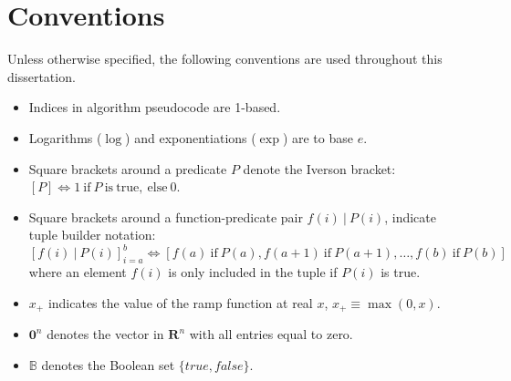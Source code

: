 \chapter*{Conventions}
Unless otherwise specified, the following conventions are used throughout this dissertation.

\begin{itemize}
  \item Indices in algorithm pseudocode are 1-based.
  \item Logarithms ($\log$) and exponentiations ($\exp$) are to base $e$.
  \item Square brackets around a predicate $P$ denote the Iverson bracket: $\left[P\right] \Leftrightarrow 1\ \mathrm{if}\ P \mathrm{~is~true,~else}\ 0$.
  \item Square brackets around a function-predicate pair $f(i)~|~P(i)$, indicate tuple builder notation: 
  \[
  \left[f(i)~|~P(i)\right]_{i=a}^b \Leftrightarrow \left[ f(a)~\mathrm{if}~P(a), f(a+1)~\mathrm{if}~P(a+1), \dots, f(b)~\mathrm{if}~P(b) \right]
  \]
  where an element $f(i)$ is only included in the tuple if $P(i)$ is true.
  \item $x_+$ indicates the value of the ramp function at real $x$, $x_+ \equiv \max(0, x)$.
  \item $\mathbf{0}^n$ denotes the vector in $\mathbf{R}^n$ with all entries equal to zero.
  \item $\mathbb{B}$ denotes the Boolean set $\{true, false\}$.
\end{itemize}
